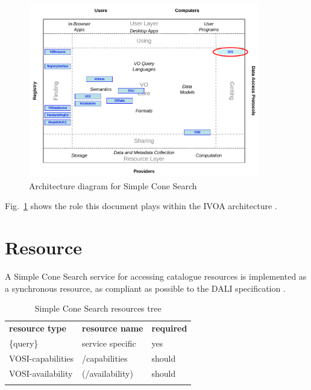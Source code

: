 \documentclass[11pt,a4paper]{ivoa}
\begin{document}
\begin{figure}
\centering


\includegraphics[width=0.9\textwidth]{role_diagram.pdf}
\caption{Architecture diagram for Simple Cone Search}
\label{fig:archdiag} 
\end{figure}

Fig.~\ref{fig:archdiag} shows the role this document plays within the
IVOA architecture \citep{2010ivoa.rept.1123A}.

\section{Resource}
\label{sec:resif}

A Simple Cone Search service for accessing catalogue resources is
implemented as a synchronous resource, as compliant as possible to the
DALI specification \citep{2017ivoa.spec.0517D}.

\begin{table}[th] 
\begin{center}
\begin{tabular}{p{}p{}p{}}
\sptablerule \textbf{resource type}&\textbf{resource name}&\textbf{required}\\ 
\sptablerule \{query\} & service specific & yes\\ VOSI-capabilities & /capabilities & should\\ VOSI-availability & (/availability) & should\\ 
\sptablerule 
\label{table:resources} 
\end{tabular} 
\caption{Simple Cone Search resources tree} 
\end{center}
\end{table}
\end{document}
